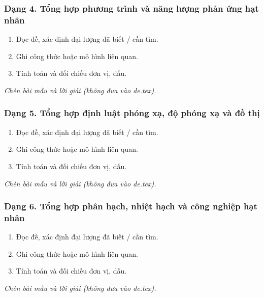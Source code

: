\subsubsection{Dạng 4. Tổng hợp phương trình và năng lượng phản ứng hạt nhân}
\begin{phuongphap}
\begin{enumerate}
\item Đọc đề, xác định đại lượng đã biết / cần tìm.
\item Ghi công thức hoặc mô hình liên quan.
\item Tính toán và đối chiếu đơn vị, dấu.
\end{enumerate}
\end{phuongphap}
\begin{vidumau}
\textit{Chèn bài mẫu và lời giải (không đưa vào de.tex).}
\end{vidumau}

\subsubsection{Dạng 5. Tổng hợp định luật phóng xạ, độ phóng xạ và đồ thị}
\begin{phuongphap}
\begin{enumerate}
\item Đọc đề, xác định đại lượng đã biết / cần tìm.
\item Ghi công thức hoặc mô hình liên quan.
\item Tính toán và đối chiếu đơn vị, dấu.
\end{enumerate}
\end{phuongphap}
\begin{vidumau}
\textit{Chèn bài mẫu và lời giải (không đưa vào de.tex).}
\end{vidumau}

\subsubsection{Dạng 6. Tổng hợp phân hạch, nhiệt hạch và công nghiệp hạt nhân}
\begin{phuongphap}
\begin{enumerate}
\item Đọc đề, xác định đại lượng đã biết / cần tìm.
\item Ghi công thức hoặc mô hình liên quan.
\item Tính toán và đối chiếu đơn vị, dấu.
\end{enumerate}
\end{phuongphap}
\begin{vidumau}
\textit{Chèn bài mẫu và lời giải (không đưa vào de.tex).}
\end{vidumau}

